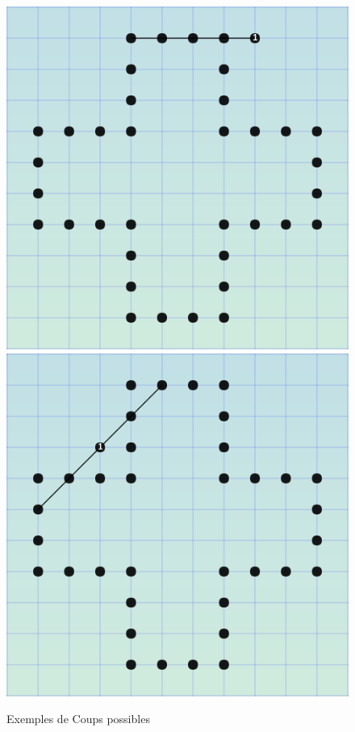 \documentclass[11pt]{article}
\begin{document}
\begin{figure}[htp]
\centering
\includegraphics[scale=1.00]{Exemple_segment1.png}
\includegraphics[scale=1.00]{Exemple_segment2.png}
\caption{Exemples de Coups possibles}
\label{}
\end{figure}
\end{document}
